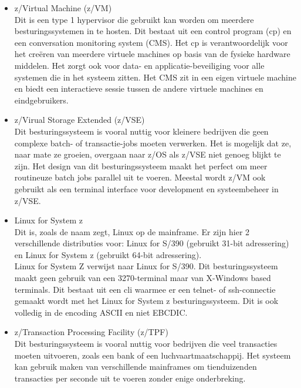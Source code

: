 \begin{itemize}
    \item z/Virtual Machine (z/VM)\\
    Dit is een type 1 hypervisor die gebruikt kan worden om meerdere besturingssystemen in te hosten. Dit bestaat uit een control program (cp) en een conversation monitoring system (CMS). Het cp is verantwoordelijk voor het creëren van meerdere virtuele machines op basis van de fysieke hardware middelen. Het zorgt ook voor data- en applicatie-beveiliging voor alle systemen die in het systeem zitten. Het CMS zit in een eigen virtuele machine en biedt een interactieve sessie tussen de andere virtuele machines en eindgebruikers. \autocite{IBMb} \\
    
    \item z/Virual Storage Extended (z/VSE) \\
    Dit besturingssysteem is vooral nuttig voor kleinere bedrijven die geen complexe batch- of transactie-jobs moeten verwerken. Het is mogelijk dat ze, naar mate ze groeien, overgaan naar z/OS als z/VSE niet genoeg blijkt te zijn. Het design van dit besturingssysteem maakt het perfect om meer routineuze batch jobs parallel uit te voeren. Meestal wordt z/VM ook gebruikt als een terminal interface voor development en systeembeheer in z/VSE. \autocite{IBMb} \\
    
    \item Linux for System z \\
    Dit is, zoals de naam zegt, Linux op de mainframe. Er zijn hier 2 verschillende distributies voor: Linux for S/390 (gebruikt 31-bit adressering) en Linux for System z (gebruikt 64-bit adressering). \\
    Linux for System Z verwijst naar Linux for S/390. Dit besturingssysteem maakt geen gebruik van een 3270-terminal maar van X-Windows based terminals. Dit bestaat uit een cli waarmee er een telnet- of ssh-connectie gemaakt wordt met het Linux for System z besturingssysteem. Dit is ook volledig in de encoding ASCII en niet EBCDIC. \autocite{IBMb} \\
    
    \item z/Transaction Processing Facility (z/TPF) \\
    Dit besturingssysteem is vooral nuttig voor bedrijven die veel transacties moeten uitvoeren, zoals een bank of een luchvaartmaatschappij. Het systeem kan gebruik maken van verschillende mainframes om tienduizenden transacties per seconde uit te voeren zonder enige onderbreking. \autocite{IBMb}
\end{itemize}


